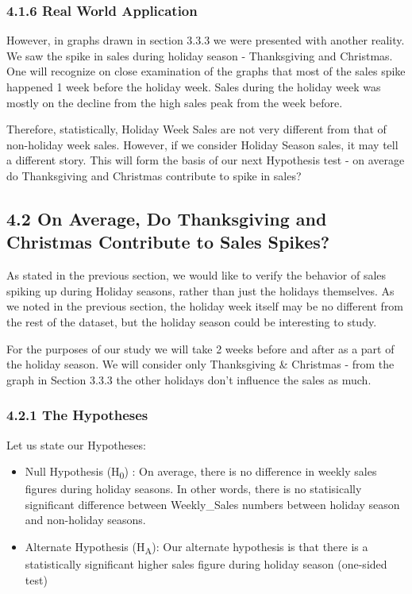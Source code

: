 \documentclass[]{article}
\begin{document}
\subsubsection{4.1.6 Real World
Application}\label{real-world-application}

However, in graphs drawn in section 3.3.3 we were presented with another
reality. We saw the spike in sales during holiday season - Thanksgiving
and Christmas. One will recognize on close examination of the graphs
that most of the sales spike happened 1 week before the holiday week.
Sales during the holiday week was mostly on the decline from the high
sales peak from the week before.

Therefore, statistically, Holiday Week Sales are not very different from
that of non-holiday week sales. However, if we consider Holiday Season
sales, it may tell a different story. This will form the basis of our
next Hypothesis test - on average do Thanksgiving and Christmas
contribute to spike in sales?

\pagebreak

\subsection{4.2 On Average, Do Thanksgiving and Christmas Contribute to
Sales
Spikes?}\label{on-average-do-thanksgiving-and-christmas-contribute-to-sales-spikes}

As stated in the previous section, we would like to verify the behavior
of sales spiking up during Holiday seasons, rather than just the
holidays themselves. As we noted in the previous section, the holiday
week itself may be no different from the rest of the dataset, but the
holiday season could be interesting to study.

For the purposes of our study we will take 2 weeks before and after as a
part of the holiday season. We will consider only Thanksgiving \&
Christmas - from the graph in Section 3.3.3 the other holidays don't
influence the sales as much.

\subsubsection{4.2.1 The Hypotheses}\label{the-hypotheses-1}

Let us state our Hypotheses:

\begin{itemize}
\itemsep1pt\parskip0pt
\item
  Null Hypothesis (H\textsubscript{0}) : On average, there is no
  difference in weekly sales figures during holiday seasons. In other
  words, there is no statisically significant difference between
  Weekly\_Sales numbers between holiday season and non-holiday seasons.
\item
  Alternate Hypothesis (H\textsubscript{A}): Our alternate hypothesis is
  that there is a statistically significant higher sales figure during
  holiday season (one-sided test)
\end{itemize}
\end{document}
